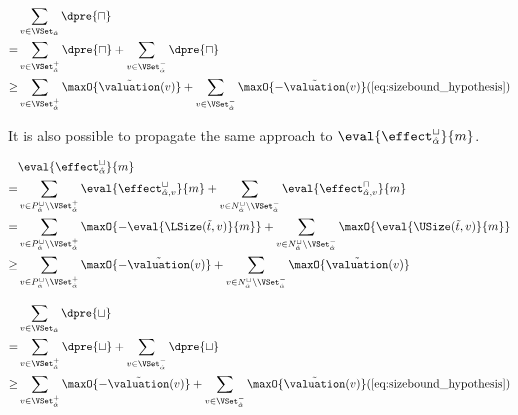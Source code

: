 \begin{equation} \label{eq:d_upper_reduction}
  \begin{split} 
  & \sum_{v \in \VSet_{\hat{\alpha}}} \dpre{\sqcap} \\
  = & \sum_{v \in \VSet^+_{\hat{\alpha}}} \dpre{\sqcap} + \sum_{v \in \VSet^-_{\hat{\alpha}}} \dpre{\sqcap} \\
  \geq & \sum_{v \in \VSet^+_{\hat{\alpha}}} \maxO{\tilde{\valuation}(v)} + \sum_{v \in \VSet^-_{\hat{\alpha}}} \maxO{-\tilde{\valuation}(v)} (\ref{eq:sizebound_hypothesis}) \\
  \end{split}      
\end{equation}

It is also possible to propagate the same approach to $\eval{\effect^\sqcup_{\hat{\alpha}}}{m}$.

\begin{equation} \label{eq:input_rv_reduction_lower}
  \begin{split}
  & \eval{\effect^\sqcup_{\hat{\alpha}}}{m} \\
  = & \sum_{v \in P_{\hat{\alpha}}^\sqcup \setminus \VSet^+_{\hat{\alpha}}} \eval{\effect^\sqcup_{{\hat{\alpha}},v}}{m}
    + \sum_{v \in N_{\hat{\alpha}}^\sqcup \setminus \VSet^-_{\hat{\alpha}}} \eval{\effect^\sqcap_{{\hat{\alpha}},v}}{m} \\
  = & \sum_{v \in P_{\hat{\alpha}}^\sqcup \setminus \VSet^+_{\hat{\alpha}}} \maxO{-\eval{\LSize(\tilde{t}, v)}{m}}
    + \sum_{v \in N_{\hat{\alpha}}^\sqcup \setminus \VSet^-_{\hat{\alpha}}} \maxO{\eval{\USize(\tilde{t}, v)}{m}} \\
  \geq & \sum_{v \in P_{\hat{\alpha}}^\sqcup \setminus \VSet^+_{\hat{\alpha}}} \maxO{-\tilde{\valuation}(v)}
    + \sum_{v \in N_{\hat{\alpha}}^\sqcup \setminus \VSet^-_{\hat{\alpha}}} \maxO{\tilde{\valuation}(v)} \\
  \end{split}
\end{equation}

\begin{equation} \label{eq:d_lower_reduction}
  \begin{split} 
  & \sum_{v \in \VSet_{\hat{\alpha}}} \dpre{\sqcup} \\
  = & \sum_{v \in \VSet^+_{\hat{\alpha}}} \dpre{\sqcup} + \sum_{v \in \VSet^-_{\hat{\alpha}}} \dpre{\sqcup} \\
  \geq & \sum_{v \in \VSet^+_{\hat{\alpha}}} \maxO{-\tilde{\valuation}(v)} + \sum_{v \in \VSet^-_{\hat{\alpha}}} \maxO{\tilde{\valuation}(v)} (\ref{eq:sizebound_hypothesis}) \\
  \end{split}      
\end{equation}

